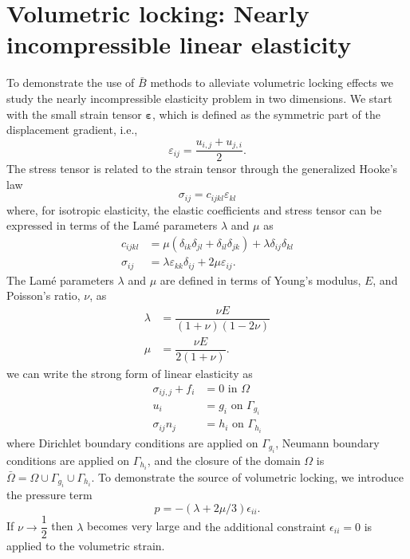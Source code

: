\section{Volumetric locking: Nearly incompressible linear elasticity}
\label{sec:nearlyincompressible}
To demonstrate the use of \Bezier $\bar{B}$ {methods} to alleviate volumetric locking effects we study the nearly incompressible elasticity problem in two dimensions. We start with the small strain tensor $\boldsymbol{\varepsilon}$, which is defined as the symmetric part of the displacement gradient, i.e.,
\begin{equation}
    \varepsilon_{ij}=\dfrac{u_{i,j}+u_{j,i}}{2}.
\end{equation}
The stress tensor is related to the strain tensor through the generalized Hooke's law
\begin{equation}
    \sigma_{ij}=c_{ijkl}\varepsilon_{kl}
\end{equation}
where, for isotropic elasticity, the elastic coefficients and stress tensor can be expressed in terms of the Lam\'{e} parameters $\lambda$ and $\mu$ as
\begin{align}
    c_{ijkl}    & =\mu(\delta_{ik}\delta_{jl}+\delta_{il}\delta_{jk})+\lambda\delta_{ij}\delta_{kl} \\
    \sigma_{ij} & = \lambda\varepsilon_{kk}\delta_{ij} + 2\mu\varepsilon_{ij}.
\end{align}
The Lam\'e parameters $\lambda$ and $\mu$ are defined in terms of Young's modulus, $E$, and Poisson's ratio, $\nu$, as
\begin{align}
    \lambda & =\dfrac{\nu{E}}{(1+\nu)(1-2\nu)} \\
    \mu     & =\dfrac{\nu{E}}{2(1+\nu)}.
\end{align}
we can write the strong form of linear elasticity as
\begin{align}
    \sigma_{ij,j}+f_i & = 0 \text{ in $\Omega$}        \\
    u_i               & = g_i\text{ on $\Gamma_{g_i}$} \\
    \sigma_{ij}n_j    & = h_i\text{ on $\Gamma_{h_i}$}
\end{align}
where Dirichlet boundary conditions are applied on $\Gamma_{g_i}$, Neumann boundary conditions are applied on $\Gamma_{h_i}$, and the closure of the domain $\Omega$ is $\bar{\Omega}=\Omega\cup\Gamma_{g_i}\cup\Gamma_{h_i}$. {To demonstrate the source of volumetric locking, we introduce the pressure term}
\begin{equation}
    p=-(\lambda+2\mu/3){\epsilon}_{ii}.
\end{equation}
If $\nu\rightarrow\dfrac{1}{2}$ then $\lambda$ becomes very large and {the additional constraint $\epsilon_{ii} = 0$ is applied to the volumetric strain.}

